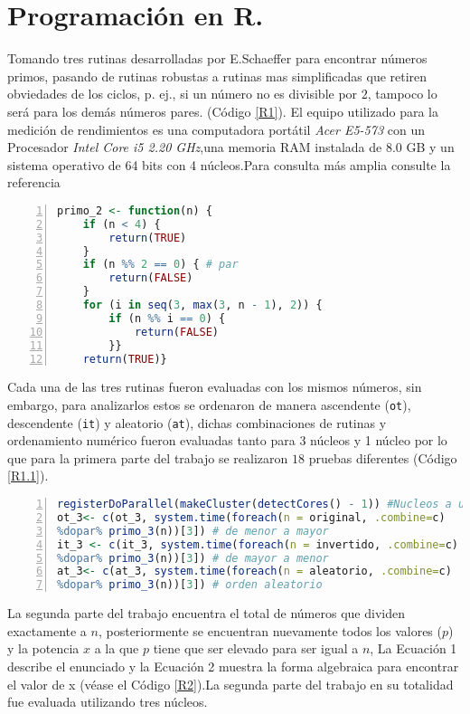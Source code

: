 \documentclass{article}
\begin{document}
\section{Programación en R.}
Tomando tres rutinas desarrolladas por E.Schaeffer \citep{E.Schaeffer} para encontrar números primos, pasando de rutinas robustas a rutinas mas simplificadas que retiren obviedades de los ciclos, p. ej., si un número no es divisible por $2$, tampoco lo será para los demás números pares. (Código \ref{R1}).
El equipo utilizado para la medición de rendimientos es una computadora portátil \emph{Acer E5-573 } con un Procesador \emph{Intel Core i5 2.20 GHz},una memoria RAM instalada de 8.0 GB y un sistema operativo de 64 bits con 4 núcleos.Para consulta más amplia consulte la referencia \citep{REPOP2}
\lstset{basicstyle=\ttfamily, keywordstyle=\bfseries}
\begin{lstlisting}[frame=single,numbers=left,language=R,caption=Función eliminando los elementos que no son divisibles entre $2$ para encontrar los número primos. \label{R1}]
  primo_2 <- function(n) {
    if (n < 4) {
        return(TRUE)
    }
    if (n %% 2 == 0) { # par
        return(FALSE)
    }
    for (i in seq(3, max(3, n - 1), 2)) {
        if (n %% i == 0) {
            return(FALSE)
        }}
    return(TRUE)}
\end{lstlisting}  
Cada una de las tres rutinas fueron evaluadas con los mismos números, sin embargo, para analizarlos estos se ordenaron de manera ascendente (\texttt{ot}), descendente (\texttt{it}) y aleatorio (\texttt{at}), dichas combinaciones de rutinas y ordenamiento numérico fueron evaluadas tanto para 3 núcleos y 1 núcleo por lo que para la primera parte del trabajo se realizaron $18$ pruebas diferentes (Código \ref{R1.1}).
\lstset{basicstyle=\ttfamily, keywordstyle=\bfseries}
\begin{lstlisting}[frame=single,numbers=left,language=R,caption=La rutina 3 evaluada para cada ordenamiento de los números y la selección de los núcleos a utilizar. \label{R1.1}]
registerDoParallel(makeCluster(detectCores() - 1)) #Nucleos a utilizar
ot_3<- c(ot_3, system.time(foreach(n = original, .combine=c)
%dopar% primo_3(n))[3]) # de menor a mayor
it_3 <- c(it_3, system.time(foreach(n = invertido, .combine=c)
%dopar% primo_3(n))[3]) # de mayor a menor
at_3<- c(at_3, system.time(foreach(n = aleatorio, .combine=c) 
%dopar% primo_3(n))[3]) # orden aleatorio
\end{lstlisting}
La segunda parte del trabajo encuentra el total de números que dividen exactamente a $n$, posteriormente se encuentran nuevamente todos los valores ($p$) y la potencia $x$ a la que $p$ tiene que ser elevado para ser igual a $n$, La Ecuación 1 describe el enunciado y la Ecuación 2 muestra la forma algebraica para encontrar el valor de x (véase el Código \ref{R2}).La segunda parte del trabajo en su totalidad fue evaluada utilizando tres núcleos.
\end{document}
